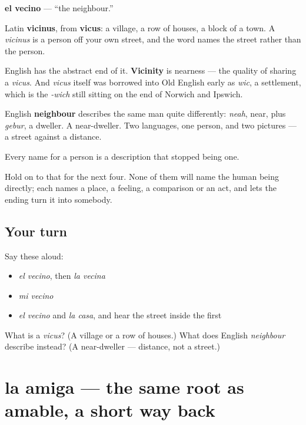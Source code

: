 \begin{cousinweb}
\textbf{el vecino} — \textquotedblleft{}the neighbour.\textquotedblright{}

Latin \textbf{vicinus}, from \textbf{vicus}: a village, a row of houses, a block of a town. A \emph{vicinus} is a person off your own street, and the word names the street rather than the person.

English has the abstract end of it. \textbf{Vicinity} is nearness — the quality of sharing a \emph{vicus}. And \emph{vicus} itself was borrowed into Old English early as \emph{wic}, a settlement, which is the \emph{-wich} still sitting on the end of Norwich and Ipswich.

English \textbf{neighbour} describes the same man quite differently: \emph{neah}, near, plus \emph{gebur}, a dweller. A near-dweller. Two languages, one person, and two pictures — a street against a distance.
\end{cousinweb}

\begin{grammarlens}[title={What you've built}]
Every name for a person is a description that stopped being one.

Hold on to that for the next four. None of them will name the human being directly; each names a place, a feeling, a comparison or an act, and lets the ending turn it into somebody.
\end{grammarlens}

\subsection*{Your turn}
Say these aloud:

\begin{itemize}
\raggedright
  \item \emph{el vecino}, then \emph{la vecina}
  \item \emph{mi vecino}
  \item \emph{el vecino} and \emph{la casa}, and hear the street inside the first
\end{itemize}

\begin{tcolorbox}[breakable,colback=teal!4,colframe=teal!35!black,title={Before you move on}]
What is a \emph{vicus}? (A village or a row of houses.) What does English \emph{neighbour} describe instead? (A near-dweller — distance, not a street.)
\end{tcolorbox}
\section[la amiga]{la amiga — the same root as amable, a short way back}

